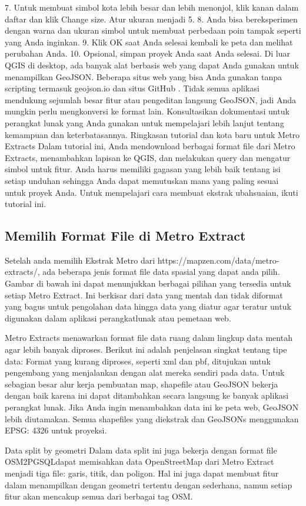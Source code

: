 7.	Untuk membuat simbol kota lebih besar dan lebih menonjol, klik kanan dalam daftar dan klik Change size. Atur ukuran menjadi 5.
8.	Anda bisa bereksperimen dengan warna dan ukuran simbol untuk membuat perbedaan poin tampak seperti yang Anda inginkan.
9.	Klik OK saat Anda selesai kembali ke peta dan melihat perubahan Anda.
10.	Opsional, simpan proyek Anda saat Anda selesai.
Di luar QGIS di desktop, ada banyak alat berbasis web yang dapat Anda gunakan untuk menampilkan GeoJSON. Beberapa situs web yang bisa Anda gunakan tanpa scripting termasuk geojson.io dan situs GitHub . Tidak semua aplikasi mendukung sejumlah besar fitur atau pengeditan langsung GeoJSON, jadi Anda mungkin perlu mengkonversi ke format lain. Konsultasikan dokumentasi untuk perangkat lunak yang Anda gunakan untuk mempelajari lebih lanjut tentang kemampuan dan keterbatasannya.
Ringkasan tutorial dan kota baru untuk Metro Extracts
Dalam tutorial ini, Anda mendownload berbagai format file dari Metro Extracts, menambahkan lapisan ke QGIS, dan melakukan query dan mengatur simbol untuk fitur. Anda harus memiliki gagasan yang lebih baik tentang isi setiap unduhan sehingga Anda dapat memutuskan mana yang paling sesuai untuk proyek Anda. Untuk mempelajari cara membuat ekstrak ubahsuaian, ikuti tutorial ini.

\subsection{Memilih Format File di Metro Extract}
Setelah anda memilih Ekstrak Metro dari https://mapzen.com/data/metro-extracts/, ada beberapa jenis format file data spasial yang dapat
anda pilih. Gambar di bawah ini dapat menunjukkan berbagai pilihan yang tersedia untuk setiap Metro Extract. Ini berkisar dari data yang
mentah dan tidak diformat yang bagus untuk pengolahan data hingga data yang diatur agar teratur untuk digunakan dalam aplikasi perangkatlunak atau pemetaan web.

Metro Extracts menawarkan format file data ruang dalam lingkup data mentah agar lebih banyak diproses. 
Berikut ini adalah penjelasan singkat tentang tipe data: Format yang kurang diproses, seperti xml dan pbf, ditujukan untuk pengembang yang menjalankan dengan alat mereka sendiri pada data. 
Untuk sebagian besar alur kerja pembuatan map, shapefile atau GeoJSON bekerja dengan baik karena ini dapat ditambahkan secara langsung ke banyak aplikasi perangkat lunak. 
Jika Anda ingin menambahkan data ini ke peta web, GeoJSON lebih diutamakan. Semua shapefiles yang diekstrak dan GeoJSONs menggunakan EPSG: 4326 untuk proyeksi.

Data split by geometri
Dalam data split ini juga bekerja dengan format file OSM2PGSQLdapat memisahkan data OpenStreetMap dari Metro Extract menjadi tiga file: garis, titik, dan poligon. Hal ini juga dapat membuat fitur dalam menampilkan dengan geometri tertentu dengan sederhana, namun setiap fitur akan mencakup semua dari berbagai tag OSM. 

